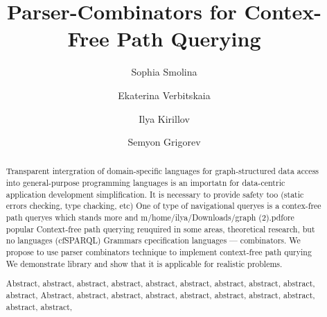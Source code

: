 \documentclass[sigconf]{acmart}
\begin{document}
\title{Parser-Combinators for Contex-Free Path Querying}


\author{Sophia Smolina}

\author{Ekaterina Verbitskaia}

\author{Ilya Kirillov}

\author{Semyon Grigorev}

\renewcommand{\shortauthors}{Smolina et al.}

\begin{abstract}
Transparent intergration of domain-specific languages for graph-structured data access into general-purpose programming languages is an importatn for data-centric application development simplification.
It is necessary to provide safety too (static errors checking, type chacking, etc)
One of type of navigational queryes is a contex-free path queryes which stands more and m/home/ilya/Downloads/graph (2).pdfore popular
Context-free path querying reuquired in some areas, theoretical research, but no languages (cfSPARQL)
Grammars cpecification languages --- combinators.
We propose to use parser combinators technique to implement context-free path qurying 
We demonstrate library and show that it is applicable for realistic problems.

Abstract, abstract, abstract, abstract, abstract, abstract, abstract, abstract, abstract, abstract,
Abstract, abstract, abstract, abstract, abstract, abstract, abstract, abstract, abstract, abstract,
\end{abstract}
\end{document}
